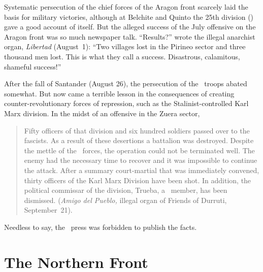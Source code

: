 \vspace{-0.33\baselineskip}

\indexLibertad{}
Systematic persecution of the chief forces of the Aragon front scarcely laid the basis for military victories, although at Belchite and Quinto the 25th division (\CNT) gave a good account of itself. But the alleged success of the July offensive on the Aragon front was so much newspaper talk. ``Results?'' wrote the illegal anarchist organ, \emph{Libertad} (August~1): ``Two villages lost in the Pirineo sector and three thousand men lost. This is what they call a success. Disastrous, calamitous, shameful success!''

After the fall of Santander (August 26), the persecution of the \CNT\ troops abated somewhat. But now came a terrible lesson in the consequences of creating counter-revolutionary forces of repression, such as the Stalinist-controlled Karl Marx division. In the midst of an offensive in the Zuera sector,

\vspace{-0.33\baselineskip}

\indexCNT\indexPSUC{}
\begin{quotation}
  Fifty officers of that division and six hundred soldiers pass\-ed over to the fascists. As a result of these desertions a battalion was destroyed. Despite the mettle of the \CNT\ forces, the operation could not be terminated well. The enemy had the necessary time to recover and it was impossible to continue the attack. After a summary court-martial that was immediately convened, thirty officers of the Karl Marx Division have been shot. In addition, the political commissar of the division, Trueba, a \PSUC\ member, has been dismissed. (\emph{Amigo del Pueblo,} illegal organ of Friends of Durruti, September~21).
\end{quotation}

\vspace{-0.33\baselineskip}

Needless to say, the \CNT\ press was forbidden to publish the facts.

\section{The Northern Front}

